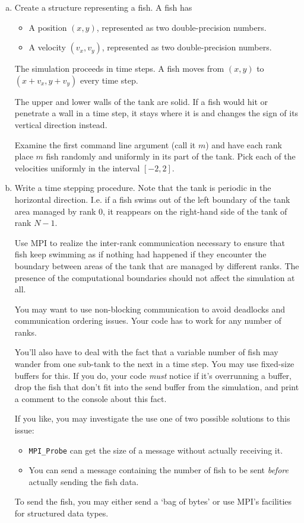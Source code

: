 \documentclass[11pt]{article}
\begin{document}
\begin{enumerate}[a)]
  \item Create a structure representing a fish. A fish has
    \begin{itemize}
      \item A position $(x,y)$, represented as two double-precision
        numbers.
      \item A velocity $(v_x,v_y)$, represented as two double-precision
        numbers.
    \end{itemize}
    The simulation proceeds in time steps. A fish moves from $(x,y)$
    to $(x+v_x, y+v_y)$ every time step.

    The upper and lower walls of the tank are solid. If a fish would
    hit or penetrate a wall in a time step, it stays where it is and
    changes the sign of its vertical direction instead.

    Examine the first command line argument (call it $m$) and have
    each rank place $m$ fish randomly and uniformly in its part of the
    tank. Pick each of the velocities uniformly in the interval
    $[-2,2]$.

  \item Write a time stepping procedure. Note that the tank is
    periodic in the horizontal direction. I.e. if a fish swims out of
    the left boundary of the tank area managed by rank $0$, it
    reappears on the right-hand side of the tank of rank $N-1$.

    Use MPI to realize the inter-rank communication necessary to
    ensure that fish keep swimming as if nothing had happened if they
    encounter the boundary between areas of the tank that are managed
    by different ranks. The presence of the computational boundaries
    should not affect the simulation at all.

    You may want to use non-blocking communication to avoid deadlocks
    and communication ordering issues. Your code has to work for any
    number of ranks.

    You'll also have to deal with the fact that a variable number of
    fish may wander from one sub-tank to the next in a time step.
    You may use fixed-size buffers for this. If you do, your code
    \emph{must} notice if it's overrunning a buffer, drop the fish
    that don't fit into the send buffer from the simulation, and print
    a comment to the console about this fact.

    If you like, you may investigate the use one of two possible
    solutions to this issue:
    \begin{itemize}
      \item \texttt{MPI\_Probe} can get the size of a message without
        actually receiving it.
      \item You can send a message containing the number of fish to be
        sent \emph{before} actually sending the fish data.
    \end{itemize}
    To send the fish, you may either send a `bag of bytes' or use
    MPI's facilities for structured data types.


\end{enumerate}
\end{document}
